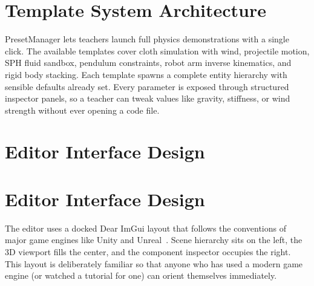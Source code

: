 \documentclass[9pt,openany]{extbook}
\begin{document}
\section{Template System Architecture}

PresetManager lets teachers launch full physics demonstrations with a single click. The available templates cover cloth simulation with wind, projectile motion, SPH fluid sandbox, pendulum constraints, robot arm inverse kinematics, and rigid body stacking. Each template spawns a complete entity hierarchy with sensible defaults already set. Every parameter is exposed through structured inspector panels, so a teacher can tweak values like gravity, stiffness, or wind strength without ever opening a code file.

\section{Editor Interface Design}

\section{Editor Interface Design}

The editor uses a docked Dear ImGui layout that follows the conventions of major game engines like Unity and Unreal~\cite{unity2024editor}. Scene hierarchy sits on the left, the 3D viewport fills the center, and the component inspector occupies the right. This layout is deliberately familiar so that anyone who has used a modern game engine (or watched a tutorial for one) can orient themselves immediately.
\end{document}
